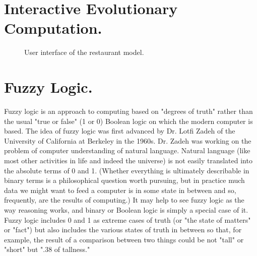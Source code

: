 \section{Interactive Evolutionary Computation.}
\begin{figure}
\captionsetup{justification=centering,margin=2cm}
\centering
\setlength\fboxsep{0pt}
\setlength\fboxrule{0.7pt}
\caption{User interface of the restaurant model.}
\label{fig:restaurantmodel}       
\end{figure}


\section{Fuzzy Logic.}

Fuzzy logic is an approach to computing based on "degrees of truth" rather than
the usual "true or false" (1 or 0) Boolean logic on which the modern computer is
based.  The idea of fuzzy logic was first advanced by Dr. Lotfi Zadeh of the
University of California at Berkeley in the 1960s. Dr. Zadeh was working on the
problem of computer understanding of natural language. Natural language (like
most other activities in life and indeed the universe) is not easily translated
into the absolute terms of 0 and 1. (Whether everything is ultimately
describable in binary terms is a philosophical question worth pursuing, but in
practice much data we might want to feed a computer is in some state in between
and so, frequently, are the results of computing.) It may help to see fuzzy
logic as the way reasoning works, and binary or Boolean logic is simply a
special case of it. Fuzzy logic includes 0 and 1 as extreme cases of truth (or
"the state of matters" or "fact") but also includes the various states of truth
in between so that, for example, the result of a comparison between two things
could be not "tall" or "short" but ".38 of tallness."

